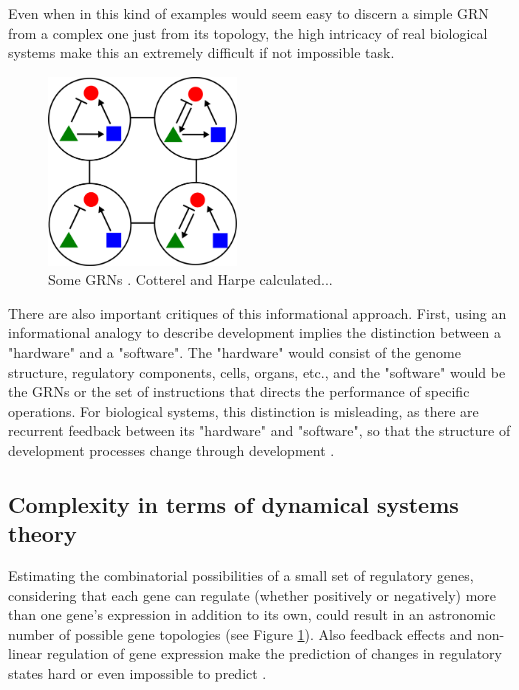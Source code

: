 Even when in this kind of examples would seem easy to discern a simple GRN from a complex one just from its topology, the high intricacy of real biological systems make this an extremely difficult if not impossible task. 

\begin{figure}[h]
  \includegraphics[width=5cm]{./Images/GRNs.png}
  \centering
  \caption{
  Some GRNs . Cotterel and Harpe calculated... \citep{Cotterell2010}
 }
  \label{fig:GRNs}
\end{figure}

There are also important critiques of this informational approach. First, using an informational analogy to describe development implies the distinction between a "hardware" and a "software".
The "hardware" would consist of the genome structure, regulatory components, cells, organs, etc., and the "software" would be the GRNs or the set of instructions that directs the performance of specific operations.
For biological systems, this distinction is misleading, as there are recurrent feedback between its "hardware" and "software", so that the structure of development processes change through development \citep{susan2000ontogeny,Salazar-Ciudad2009,Jaeger2014devmech}.


\subsection{Complexity in terms of dynamical systems theory}

Estimating the combinatorial possibilities of a small set of regulatory genes, considering that each gene can regulate (whether positively or negatively) more than one gene's expression in addition to its own, could result in an astronomic number of possible gene topologies (see Figure \ref{fig:GRNs}).
Also feedback effects and non-linear regulation of gene expression make the prediction of changes in regulatory states hard or even impossible to predict \citep{Jaeger2014devmech}.

